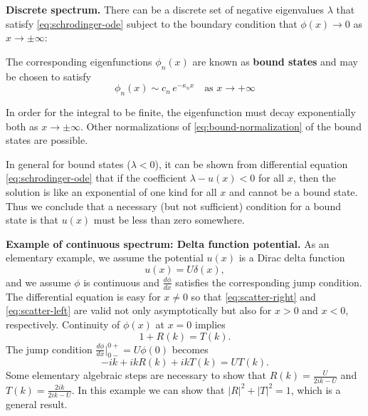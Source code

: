 \textbf{Discrete spectrum.}  There can be a discrete set of negative eigenvalues $\lambda$ that satisfy \eqref{eq:schrodinger-ode} subject to the boundary condition that $\phi(x) \to 0$ as $x \to \pm\infty$:

The corresponding eigenfunctions $\phi_n(x)$ are known as \textbf{bound states} and may be chosen to satisfy
\begin{equation}
\label{eq:bound-asymptotic}
\phi_n(x) \sim c_n\,e^{-\kappa_n x} \quad \text{as } x \to +\infty
\end{equation}

In order for the integral to be finite, the eigenfunction must decay exponentially both as $x \to \pm\infty$.  Other normalizations of \eqref{eq:bound-normalization} of the bound states are possible.

In general for bound states ($\lambda < 0$), it can be shown from differential equation \eqref{eq:schrodinger-ode} that if the coefficient $\lambda - u(x) < 0$ for all $x$, then the solution is like an exponential of one kind for all $x$ and cannot be a bound state.  Thus we conclude that a necessary (but not sufficient) condition for a bound state is that $u(x)$ must be less than zero somewhere.

\textbf{Example of continuous spectrum: Delta function potential.}  As an elementary example, we assume the potential $u(x)$ is a Dirac delta function
\begin{equation}
\label{eq:delta-potential}
u(x) = U\delta(x),
\end{equation}
and we assume $\phi$ is continuous and $\frac{d\phi}{dx}$ satisfies the corresponding jump condition.  The differential equation is easy for $x \ne 0$ so that \eqref{eq:scatter-right} and \eqref{eq:scatter-left} are valid not only asymptotically but also for $x > 0$ and $x < 0$, respectively.  Continuity of $\phi(x)$ at $x = 0$ implies
\begin{equation}
\label{eq:delta-continuity}
1 + R(k) = T(k).
\end{equation}
The jump condition $\frac{d\phi}{dx}\big|_{0-}^{0+} = U\phi(0)$ becomes
\begin{equation}
\label{eq:delta-jump}
-ik + ikR(k) + ikT(k) = UT(k).
\end{equation}
Some elementary algebraic steps are necessary to show that $R(k) = \frac{U}{2ik-U}$ and $T(k) = \frac{2ik}{2ik-U}$.  In this example we can show that $|R|^2 + |T|^2 = 1$, which is a general result.

